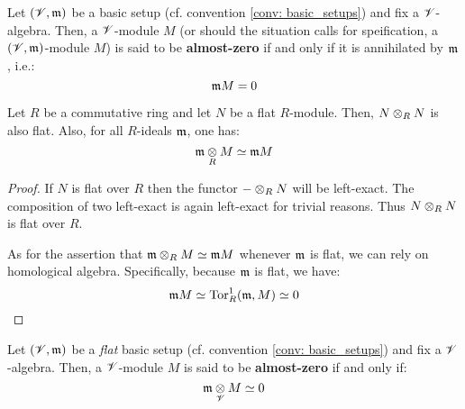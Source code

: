                 \begin{definition} \label{def: almost_zero_modules}
                    Let $(\mathscr{V}, \mathfrak{m})$ be a basic setup (cf. convention \ref{conv: basic_setups}) and fix a $\mathscr{V}$-algebra. Then, a $\mathscr{V}$-module $M$ (or should the situation calls for speification, a $(\mathscr{V}, \mathfrak{m})$-module $M$) is said to be \textbf{almost-zero} if and only if it is annihilated by $\mathfrak{m}$, i.e.:
                        $$\mathfrak{m} M = 0$$
                \end{definition}
                \begin{lemma} \label{lemma: tensor_powers_of_flat_modules}
                    Let $R$ be a commutative ring and let $N$ be a flat $R$-module. Then, $N \tensor_R N$ is also flat. Also, for all $R$-ideals $\mathfrak{m}$, one has:
                        $$\m \tensor_R M \cong \m M$$
                \end{lemma}
                    \begin{proof}
                        If $N$ is flat over $R$ then the functor $- \tensor_R N$ will be left-exact. The composition of two left-exact is again left-exact for trivial reasons. Thus $N \tensor_R N$ is flat over $R$.
                        
                        As for the assertion that $\m \tensor_R M \cong \m M$ whenever $\mathfrak{m}$ is flat, we can rely on homological algebra. Specifically, because $\mathfrak{m}$ is flat, we have:
                            $$\mathfrak{m} M \simeq \mathrm{Tor}_R^1(\mathfrak{m}, M) \simeq 0$$
                    \end{proof}
                \begin{proposition} \label{prop: almost_zero_module_alt_def}
                    Let $(\mathscr{V}, \mathfrak{m})$ be a \textit{flat} basic setup (cf. convention \ref{conv: basic_setups}) and fix a $\mathscr{V}$-algebra. Then, a $\mathscr{V}$-module $M$ is said to be \textbf{almost-zero} if and only if:
                        $$\m \tensor_{\scrV} M  \cong0$$
                \end{proposition}
